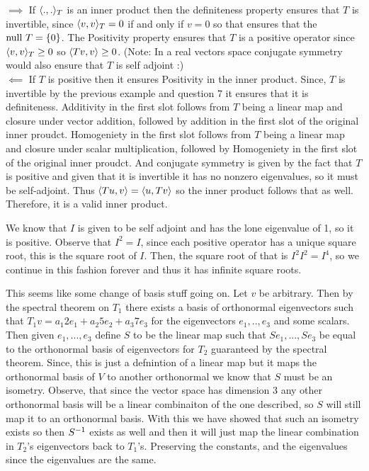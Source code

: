 \documentclass[10pt, twocolumn]{article}
\begin{document}
\begin{q}[8]
    $ \implies $ If $ \langle .,.\rangle_T $ is an inner product then the definiteness property ensures that $ T $ is invertible, 
    since $ \langle v, v\rangle_T = 0 $ if and only if $ v = 0 $ so that ensures that the $ \text{null } T = \{0\} $.
    The Positivity property ensures that $ T $ is a positive operator since $ \langle v, v\rangle_T \geq 0 $ so $ \langle Tv, v\rangle \geq 0 $.
    (Note: In a real vectors space conjugate symmetry would also ensure that $ T $ is self adjoint :) \\
    $ \impliedby $ If $ T $ is positive then it ensures Positivity in the inner product. 
    Since, $ T $ is invertible by the previous example and question 7 it ensures that it is definiteness. 
    Additivity in the first slot follows from $ T $ being a linear map and closure under vector addition, followed by addition in the first slot of the original inner proudct.
    Homogeniety in the first slot follows from $ T $ being a linear map and closure under scalar multiplication, followed by Homogeniety in the first slot of the original inner proudct.
    And conjugate symmetry is given by the fact that $ T $ is positive and given that it is invertible it has no nonzero eigenvalues, so it must be self-adjoint. 
    Thus $ \langle Tu, v\rangle = \langle u, Tv\rangle $ so the inner product follows that as well. 
    Therefore, it is a valid inner product.
\end{q}

\begin{q}[9]
    We know that $ I $ is given to be self adjoint and has the lone eigenvalue of 1, so it is positive.
    Observe that $ I^2 = I $, since each positive operator has a unique square root, this is the square root of $ I $. 
    Then, the square root of  that  is $ I^2 I^2 = I^4 $, so we continue in this fashion forever and thus it has infinite square roots.
\end{q}

\begin{q}[11]
    This seems like some change of basis stuff going on. 
    Let $ v $ be arbitrary. Then by the spectral theorem on $ T_1 $ there exists a basis of orthonormal eigenvectors such that 
    $ T_1 v = a_1 2 e_1 + a_2 5 e_2 + a_3 7 e_3 $ for the eigenvectors $ e_1,.., e_3 $ and some scalars.
    Then given $ e_1, ..., e_3 $ define $ S $ to be the linear map such that $ Se_1, ..., Se_3 $ be equal to the orthonormal basis of eigenvectors for $ T_2 $ guaranteed by the spectral theorem. 
    Since, this is just a defnintion of a linear map but it maps the orthonormal basis of $ V $ to another orthonormal we know that $ S $ must be an isometry. 
    Observe, that since the vector space has dimension 3 any other orthonormal basis will be a linear combinaiton of the one described, so $ S $ will still map it to an orthonormal basis.  
    With this we have showed that such an isometry exists so then $ S^{-1} $ exists as well and then it will just map the linear combination in $ T_2 $'s eigenvectors back to $ T_1 $'s. 
    Preserving the constants, and the eigenvalues since the eigenvalues are the same.
\end{q}
\end{document}
